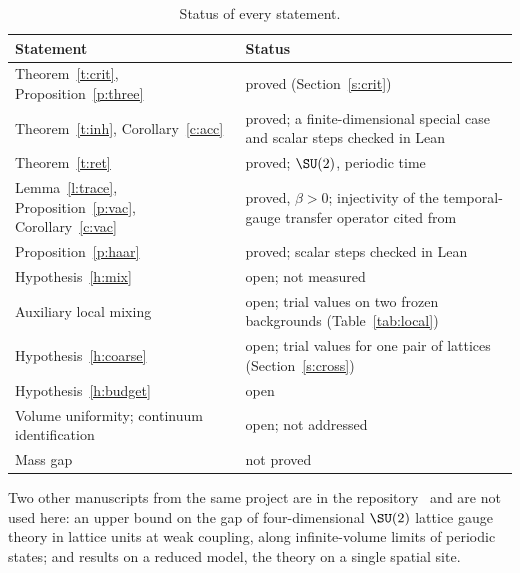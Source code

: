 \begin{table}[ht]
\centering\small
\begin{tabular}{@{}p{}p{}@{}}
\toprule
Statement & Status \\
\midrule
Theorem~\ref{t:crit}, Proposition~\ref{p:three} & proved (Section~\ref{s:crit}) \\
Theorem~\ref{t:inh}, Corollary~\ref{c:acc} & proved; a finite-dimensional special case and scalar steps checked in Lean \\
Theorem~\ref{t:ret} & proved; $\SU(2)$, periodic time \\
Lemma~\ref{l:trace}, Proposition~\ref{p:vac}, Corollary~\ref{c:vac} & proved, $\beta>0$; injectivity of the temporal-gauge transfer operator cited from~\cite{Lu77} \\
Proposition~\ref{p:haar} & proved; scalar steps checked in Lean \\
Hypothesis~\ref{h:mix} & open; not measured \\
Auxiliary local mixing & open; trial values on two frozen backgrounds (Table~\ref{tab:local}) \\
Hypothesis~\ref{h:coarse} & open; trial values for one pair of lattices (Section~\ref{s:cross}) \\
Hypothesis~\ref{h:budget} & open \\
Volume uniformity; continuum identification & open; not addressed \\
Mass gap & not proved \\
\bottomrule
\end{tabular}
\caption{Status of every statement.}\label{tab:status}
\end{table}

Two other manuscripts from the same project are in the repository~\cite{Repo} and are not used here: an
upper bound on the gap of four-dimensional $\SU(2)$ lattice gauge theory in lattice units at weak coupling,
along infinite-volume limits of periodic states; and results on a reduced model, the theory on a single
spatial site.

